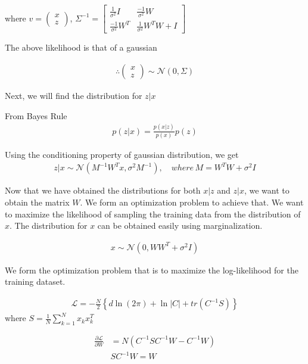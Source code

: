 \documentclass[10pt,onecolumn,letterpaper]{article}
\begin{document}
where $v = \begin{pmatrix}x \\ z\end{pmatrix}$, $\Sigma^{-1} = \begin{bmatrix} \frac{1}{\sigma^2}I& \frac{-1}{\sigma^2}W \\
    \frac{-1}{\sigma^2}W^T & \frac{1}{\sigma^2}W^T W + I \end{bmatrix}$

The above likelihood is that of a gaussian

\begin{align}
\therefore \begin{pmatrix}x \\ z\end{pmatrix} \sim \mathcal{N}\left( 0, \Sigma \right)
\end{align}

Next, we will find the distribution for $z|x$

From Bayes Rule
\begin{align}
    p(z|x) = \frac{p(x|z)}{p(x)}p(z)
\end{align}

Using the conditioning property of gaussian distribution, we get
\begin{align}
z|x \sim \mathcal{N}\left(M^{-1}W^Tx, \sigma^2M^{-1}\right), \quad where \, M = W^TW+\sigma^2I 
\end{align}

Now that we have obtained the distributions for both $x|z$ and $z|x$, we want to obtain the matrix $W$. We form an optimization problem to achieve that. We want to maximize the likelihood of sampling the training data from the distribution of $x$. The distribution for $x$ can be obtained easily using marginalization.

\begin{align}
    x \sim \mathcal{N}\left( 0 , WW^T+\sigma^2I \right)
\end{align}

We form the optimization problem that is to maximize the log-likelihood for the training dataset.

\begin{align}
    \mathcal{L} = -\frac{N}{2}\left\{
        d\ln(2\pi)+\ln|C|+tr(C^{-1}S)
    \right\} \label{eq:L}
\end{align}
where $S = \displaystyle\frac{1}{N}\sum_{k=1}^{N}x_k x_k^T$

\begin{align}
    \frac{\partial \mathcal{L}}{\partial W} &= N\left(C^{-1}SC^{-1}W - C^{-1}W\right)\\
    &SC^{-1}W = W
\end{align}
    
\end{document}
